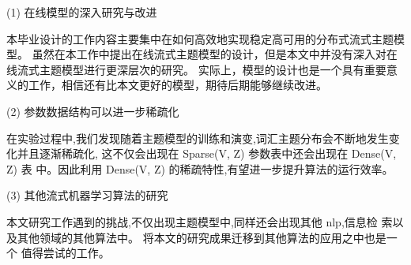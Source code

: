 (1) 在线模型的深入研究与改进 

本毕业设计的工作内容主要集中在如何高效地实现稳定高可用的分布式流式主题模型。
虽然在本工作中提出在线流式主题模型的设计，但是本文中并没有深入对在线流式主题模型进行更深层次的研究。
实际上，模型的设计也是一个具有重要意义的工作，相信还有比本文更好的模型，期待后期能够继续改进。

(2) 参数数据结构可以进一步稀疏化 

在实验过程中,我们发现随着主题模型的训练和演变,词汇主题分布会不断地发生变化并且逐渐稀疏化,
这不仅会出现在 Sparse(V, Z) 参数表中还会出现在 Dense(V, Z) 表 中。因此利用 Dense(V, Z) 的稀疏特性,有望进一步提升算法的运行效率。 

(3) 其他流式机器学习算法的研究 

本文研究工作遇到的挑战,不仅出现主题模型中,同样还会出现其他 nlp,信息检 索以及其他领域的其他算法中。
将本文的研究成果迁移到其他算法的应用之中也是一个 值得尝试的工作。

